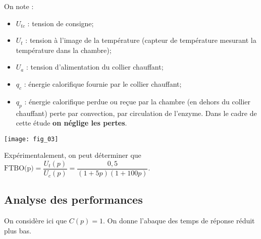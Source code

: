 


On note : 
\begin{itemize}
\item $U_{tc}$ : tension de consigne;
\item $U_t$ : tension à l'image de la température (capteur de température mesurant la température dans la chambre);
\item $U_a$ : tension d'alimentation du collier chauffant;
\item $q_c$ : énergie calorifique fournie par le collier chauffant;
\item $q_p$ : énergie calorifique perdue ou reçue par la chambre (en dehors du collier chauffant) perte par convection, par circulation de l'enzyme. Dans le cadre de cette étude \textbf{on néglige les pertes}.
\end{itemize}

\begin{center}
\texttt{[image: fig\_03]}
\end{center}
%
%
%
%
%

Expérimentalement, on peut déterminer que $\text{FTBO(p)}=\dfrac{U_t(p)}{U_c(p)}=\dfrac{0,5}{\left(1+5 p \right)\left(1+100 p \right)}$.

\subsection*{Analyse des performances}
On considère ici que $C(p)=1$. On donne l'abaque des temps de réponse réduit plus bas.



